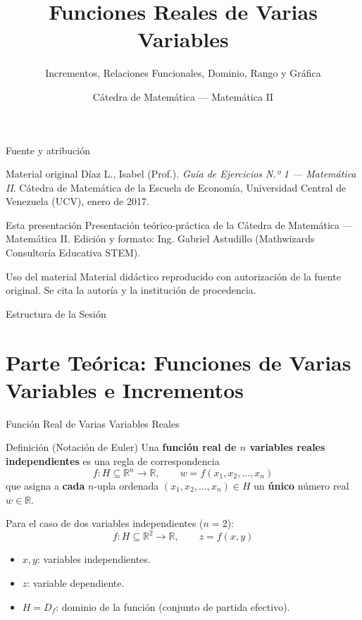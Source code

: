 \documentclass[aspectratio=169, 10pt]{beamer}
\title[Matemática II — Guía N.º 1]{Funciones Reales de Varias Variables}
\subtitle{Incrementos, Relaciones Funcionales, Dominio, Rango y Gráfica}
\author[Cátedra de Matemática]{Cátedra de Matemática — Matemática II}
\institute[UCV]{Universidad Central de Venezuela \\ Facultad de Ciencias Económicas y Sociales (FACES)}
\date{}
\begin{document}
\begin{frame}
  \titlepage
\end{frame}

\begin{frame}{Fuente y atribución}
  \small
  \begin{block}{Material original}
    Díaz L., Isabel (Prof.). \emph{Guía de Ejercicios N.º 1 — Matemática II}.
    Cátedra de Matemática de la Escuela de Economía,
    Universidad Central de Venezuela (UCV), enero de 2017.
  \end{block}
  \begin{block}{Esta presentación}
    Presentación teórico-práctica de la Cátedra de Matemática — Matemática II.
    Edición y formato: Ing. Gabriel Astudillo
    (Mathwizards Consultoría Educativa STEM).
  \end{block}
  \begin{block}{Uso del material}
    Material didáctico reproducido con autorización de la fuente original.
    Se cita la autoría y la institución de procedencia.
  \end{block}
\end{frame}

\begin{frame}{Estructura de la Sesión}
  \tableofcontents
\end{frame}

\section{Parte Teórica: Funciones de Varias Variables e Incrementos}

\begin{frame}{Función Real de Varias Variables Reales}
  \begin{block}{Definición (Notación de Euler)}
    Una \textbf{función real de $n$ variables reales independientes} es una regla de correspondencia
    \[
      f : H \subseteq \mathbb{R}^n \longrightarrow \mathbb{R}, \qquad w = f(x_1, x_2, \dots, x_n)
    \]
    que asigna a \textbf{cada} $n$-upla ordenada $(x_1, x_2, \dots, x_n) \in H$ un \textbf{único} número real $w \in \mathbb{R}$.
  \end{block}

  \vspace{0.3cm}
  Para el caso de dos variables independientes ($n=2$):
  \[
    f : H \subseteq \mathbb{R}^2 \longrightarrow \mathbb{R}, \qquad z = f(x, y)
  \]
  \begin{itemize}
    \item $x, y$: variables independientes.
    \item $z$: variable dependiente.
    \item $H = D_f$: dominio de la función (conjunto de partida efectivo).
  \end{itemize}
\end{frame}
\end{document}
